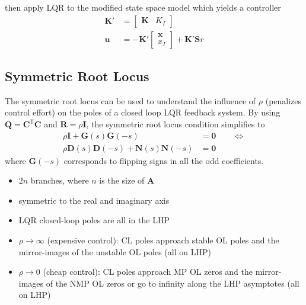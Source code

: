 then apply LQR to the modified state space model which yields a controller
\begin{align*}
    \mathbf{K}' & =\begin{bmatrix}
                       \mathbf{K} & K_I
                   \end{bmatrix}                          \\
    \mathbf{u}  & =-\mathbf{K}'\begin{bmatrix}
                                   \mathbf{x} \\
                                   x_I
                               \end{bmatrix} + \mathbf{K'S}r
\end{align*}

\subsection{Symmetric Root Locus}
The symmetric root locus can be used to understand the influence of $\rho$ (penalizes control effort) on the poles of a closed loop LQR feedback system.
By using $\mathbf{Q}=\mathbf{C}^{\mathsf{T}} \mathbf{C}$ and $\mathbf{R}=\rho \mathbf{I}$, the symmetric root locus condition simplifies to
\noindent\begin{align*}
    \rho \mathbf{I}+\mathbf{G}(s)\mathbf{G}(-s)                  & =\mathbf{0} \qquad \Leftrightarrow \\
    \rho \mathbf{D}(s)\mathbf{D}(-s)+\mathbf{N}(s)\mathbf{N}(-s) & =\mathbf{0}
\end{align*}
where $\mathbf{G}(-s)$ corresponds to flipping signs in all the odd coefficients.

\newpar{}

\begin{itemize}
    \item $2n$ branches, where $n$ is the size of $\mathbf{A}$
    \item symmetric to the real and imaginary axis
    \item LQR closed-loop poles are all in the LHP
    \item $\rho \rightarrow \infty$ (expensive control):\newline
          CL poles approach stable OL poles and the mirror-images of the unstable OL poles (all on LHP)
    \item $\rho \rightarrow 0$ (cheap control):\newline
          CL poles approach MP OL zeros and the mirror-images of the NMP OL zeros or go to infinity along the LHP asymptotes (all on LHP)
\end{itemize}

